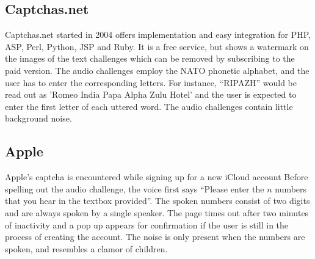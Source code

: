 \subsection{Captchas.net}

Captchas.net started in 2004 offers implementation and easy integration for PHP, ASP, Perl, 
Python, JSP and Ruby. It is a free service, but shows a watermark on the images of the text challenges 
which can be removed by subscribing to the paid version. 
The audio challenges employ the NATO phonetic alphabet, and the user has to enter the corresponding letters.
For instance, ``RIPAZH'' would be read out as 'Romeo India Papa Alpha Zulu Hotel' and the user is expected 
to enter the first letter of each uttered word. The audio challenges contain little background noise.

%

\subsection{Apple}

Apple's captcha is encountered while signing up for a new iCloud account 
Before spelling out the audio challenge, 
the voice first says ``Please enter the $n$ numbers that you hear in the textbox provided''. The 
spoken numbers consist of two digits and are always spoken by a single speaker.
The page times out after two minutes of inactivity and a pop up appears for confirmation if the user is 
still in the process of creating the account. The noise is only present when the numbers are spoken,
and resembles a clamor of children.


